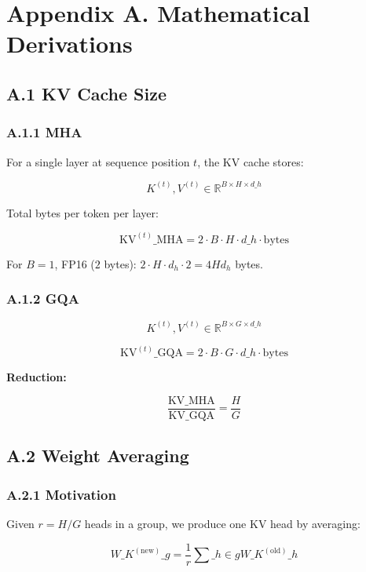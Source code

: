 
\section{Appendix A. Mathematical Derivations}

\subsection{A.1 KV Cache Size}

\subsubsection{A.1.1 MHA}

For a single layer at sequence position $t$, the KV cache stores:

\[
K^{(t)}, V^{(t)} \in \mathbb{R}^{B \times H \times d\_h}
\tag{A.1}
\]

Total bytes per token per layer:

\[
\text{KV}^{(t)}\_\text{MHA} = 2 \cdot B \cdot H \cdot d\_h \cdot \text{bytes}
\tag{A.2}
\]

For $B = 1$, FP16 ($2$ bytes): $2 \cdot H \cdot d_h \cdot 2 = 4 H d_h$ bytes.

\subsubsection{A.1.2 GQA}

\[
K^{(t)}, V^{(t)} \in \mathbb{R}^{B \times G \times d\_h}
\tag{A.3}
\]

\[
\text{KV}^{(t)}\_\text{GQA} = 2 \cdot B \cdot G \cdot d\_h \cdot \text{bytes}
\tag{A.4}
\]

\textbf{Reduction:}

\[
\frac{\text{KV}\_\text{MHA}}{\text{KV}\_\text{GQA}} = \frac{H}{G}
\tag{A.5}
\]

\subsection{A.2 Weight Averaging}

\subsubsection{A.2.1 Motivation}

Given $r = H / G$ heads in a group, we produce one KV head by averaging:

\[
W\_K^{(\text{new})}\_g = \frac{1}{r} \sum\_{h \in g} W\_K^{(\text{old})}\_h
\tag{A.6}
\]

